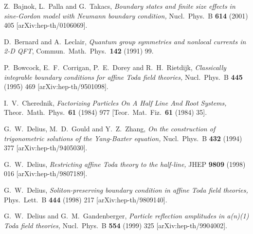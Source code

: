 \documentclass[a4paper,12pt]{article}
\numberwithin{equation}{section}
\begin{document}
\parskip 4pt
\baselineskip 5pt {\small
\begin{thebibliography}{99}
\itemsep 1pt

Z.~Bajnok, L.~Palla and G.~Takacs, \textit{Boundary states and
finite size effects in sine-Gordon model with  Neumann boundary
condition,} Nucl.\ Phys.\ B {\bf 614} (2001) 405
[arXiv:hep-th/0106069].

D.~Bernard and A.~Leclair, \textit{Quantum group symmetries and
nonlocal currents in 2-D QFT}, Commun.\ Math.\ Phys.\  {\bf 142}
(1991) 99.

P.~Bowcock, E.~F.~Corrigan, P.~E.~Dorey and R.~H.~Rietdijk,
\textit{Classically integrable boundary conditions for affine Toda
field theories,} Nucl.\ Phys.\ B {\bf 445} (1995) 469
[arXiv:hep-th/9501098].

I.~V.~Cherednik, \textit{Factorizing Particles On A Half Line And
Root Systems,} Theor.\ Math.\ Phys.\  {\bf 61} (1984) 977 [Teor.\
Mat.\ Fiz.\ {\bf 61} (1984) 35].

G.~W.~Delius, M.~D.~Gould and Y.~Z.~Zhang, \textit{On the
construction of trigonometric solutions of the Yang-Baxter
equation,} Nucl.\ Phys.\ B {\bf 432} (1994) 377
[arXiv:hep-th/9405030].


G.~W.~Delius, \textit{Restricting affine Toda theory to the
half-line,} JHEP {\bf 9809} (1998) 016 [arXiv:hep-th/9807189].

G.~W.~Delius, \textit{Soliton-preserving boundary condition in
affine Toda field theories,}  Phys.\ Lett.\ B {\bf 444} (1998) 217
[arXiv:hep-th/9809140].


G.~W.~Delius and G.~M.~Gandenberger, \textit{Particle reflection
amplitudes in a(n)(1) Toda field theories,} Nucl.\ Phys.\ B {\bf
554} (1999) 325 [arXiv:hep-th/9904002].



\end{thebibliography}}
\end{document}
